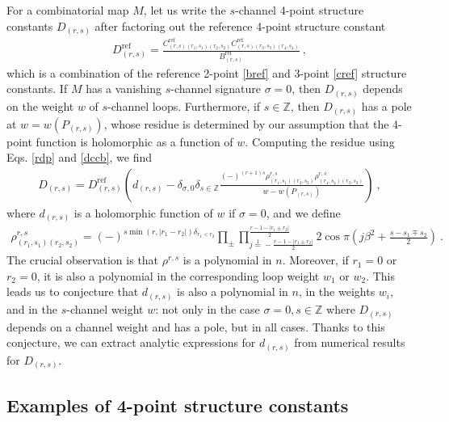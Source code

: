 \documentclass[12pt, a4paper]{article}
\newcommand{\qvertex}{
\coordinate (base) at (0, 1);
\draw (0, 0) node [cross]{};
  \draw (3, 0) node [cross]{};
  \draw (0, 3) node[cross]{};
  \draw (3, 3) node[cross]{};
}
\newcommand{\vertices}{
\coordinate (base) at (0, 1);
\draw (0, 0) node[fill, circle, minimum size = 1.3mm, inner sep = 0]{};
  \draw (3, 0) node[fill, circle, minimum size = 1.3mm, inner sep = 0]{};
  \draw (0, 3) node[fill, circle, minimum size = 1.3mm, inner sep = 0]{};
  \draw (3, 3) node[fill, circle, minimum size = 1.3mm, inner sep = 0]{};
}
\begin{document}
For a combinatorial map $M$, let us write the $s$-channel 4-point structure constants $D_{(r,s)}$ after factoring out the reference 4-point structure constant 
\begin{align}
 D_{(r,s)}^\text{ref} = \frac{C^\text{ref}_{(r,s)(r_1,s_1)(r_2,s_2)} C^\text{ref}_{(r,s)(r_3,s_3)(r_4,s_4)}}{B^\text{ref}_{(r,s)}}\ , 
\end{align}
which is a combination of the reference 2-point \eqref{bref} and 3-point \eqref{cref} structure constants. If $M$ has a vanishing $s$-channel signature $\sigma=0$, then $D_{(r,s)}$ depends on the weight $w$ of $s$-channel loops. Furthermore, if $s\in\mathbb{Z}$, then $D_{(r,s)}$ has a pole at $w=w(P_{(r,s)})$, whose residue is determined by our assumption that the 4-point function is holomorphic as a function of $w$. Computing the residue using Eqs. \eqref{rdp} and \eqref{dccb}, we find 
\begin{align}
 D_{(r,s)} =  D_{(r,s)}^\text{ref} \left(d_{(r,s)}  - \delta_{\sigma,0}\delta_{s\in\mathbb{Z}}\frac{(-)^{(r+1)s}\rho^{r,s}_{(r_1,s_1)(r_2,s_2)}\rho^{r,s}_{(r_4,s_4)(r_3,s_3)}}{w-w(P_{(r,s)})}\right) \ ,
\end{align}
where $d_{(r,s)}$ is a holomorphic function of $w$ if $\sigma=0$, and we define
\begin{align}
\rho^{r,s}_{(r_1,s_1)(r_2,s_2)}= (-)^{s\min(r,|r_1-r_2|)\delta_{r_1<r_2}} \prod_\pm \prod_{j\overset{1}{=}-\frac{r-1-|r_1\pm r_2|}{2}}^{\frac{r-1-|r_1\pm r_2|}{2}} 2\cos\pi\left(j\beta^2+\tfrac{s-s_1\mp s_2}{2}\right)\ . 
 \label{rhop}
\end{align}
The crucial observation is that $\rho^{r,s}$ is a polynomial in $n$. Moreover, if $r_1=0$ or $r_2=0$, it is also a polynomial in the corresponding loop weight $w_1$ or $w_2$. This leads us to conjecture that $d_{(r,s)}$ is also a polynomial in $n$, in the weights $w_i$, and in the $s$-channel weight $w$: not only in the case $\sigma=0, s\in\mathbb{Z}$ where $D_{(r,s)}$ depends on a channel weight and has a pole, but in all cases. 
Thanks to this conjecture, we can extract analytic expressions for $d_{(r,s)}$ from numerical results for $D_{(r,s)}$. 


\subsection{Examples of 4-point structure constants}\label{sec:ex4pt}

\DeclareRobustCommand\picz{
$
\begin{tikzpicture}[baseline=(base), scale = .25]
 \qvertex;
 \end{tikzpicture}
 $
}
\DeclareRobustCommand\pice{
$
\begin{tikzpicture}[baseline=(base), scale = .25]
  \vertices
  \draw (0, 0) -- (0, 3);
  \draw (3, 0) -- (3, 3);
 \end{tikzpicture}
$}
\DeclareRobustCommand\picj{
$
\begin{tikzpicture}[baseline=(base), scale = .25]
  \vertices
  \draw (0, 0) -- (3, 3) to [out = -120, in = 30] (0, 0);
  \draw (0,0) -- (0, 3);
  \draw (0, 3) to [out = 30, in = 135] (3.5, 3.5) to [out = -45, in =60] (3, 0);
 \end{tikzpicture}
 $}
\end{document}
